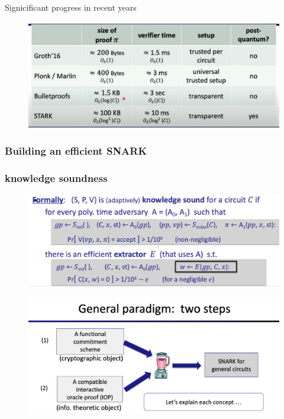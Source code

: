 \documentclass[10pt]{ctexart}
\begin{document}
Signicificant progress in recent years
\begin{figure}[H]
    \centering
    \includegraphics[width=1\textwidth]{./img/ZKP MOOC/progress.png} 
\end{figure}

\subsubsection{Building an efficient SNARK}

\subsubsection*{knowledge soundness}

\begin{figure}[H]
    \centering
    \includegraphics[width=1\textwidth]{./img/knowledge_soundness.png} 
\end{figure}

\begin{figure}[H]
    \centering
    \includegraphics[width=1\textwidth]{img/ZKP MOOC/general_paradigm.png} 
\end{figure}
\end{document}

